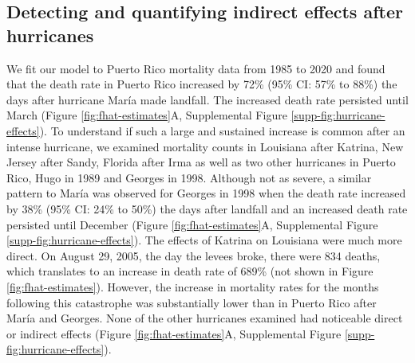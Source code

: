\documentclass[11pt]{article}
\begin{document}
\subsection{Detecting and quantifying indirect effects after hurricanes}
\label{subsec:effects}
We fit our model to Puerto Rico mortality data from 1985 to 2020 and found that the death rate in Puerto Rico increased by 72\% (95\% CI: 57\% to 88\%) the days after hurricane Mar\'ia made landfall. The increased death rate persisted until March (Figure \ref{fig:fhat-estimates}A, Supplemental Figure \ref{supp-fig:hurricane-effects}). To understand if such a large and sustained increase is common after an intense hurricane, we examined mortality counts in Louisiana after Katrina, New Jersey after Sandy, Florida after Irma as well as two other hurricanes in Puerto Rico, Hugo in 1989 and Georges in 1998.  Although not as severe, a similar pattern to Mar\'ia was observed for Georges in 1998 when the death rate increased by 38\% (95\% CI: 24\% to 50\%) the days after landfall and an increased death rate persisted until  December (Figure \ref{fig:fhat-estimates}A, Supplemental Figure \ref{supp-fig:hurricane-effects}). The effects of Katrina on Louisiana were much more direct. On August 29, 2005, the day the levees broke, there were 834 deaths, which translates to an increase in death rate of 689\% (not shown in Figure \ref{fig:fhat-estimates}). However, the increase in mortality rates for the months following this catastrophe was substantially lower than in Puerto Rico after Mar\'ia and Georges. None of the other hurricanes examined had noticeable direct or indirect effects (Figure \ref{fig:fhat-estimates}A, Supplemental Figure \ref{supp-fig:hurricane-effects}).
\end{document}
